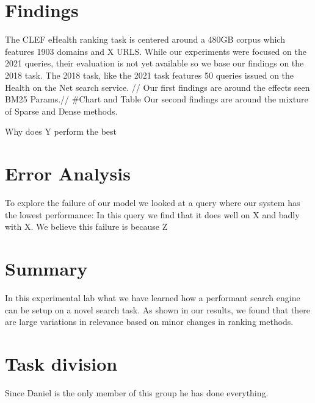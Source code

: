 \documentclass[11pt]{article}
\begin{document}
\section{Findings}
The CLEF eHealth ranking task is centered around a 480GB corpus which features 1903 domains and X URLS. While our experiments were focused on the 2021 queries, their evaluation is not yet available so we base our findings on the 2018 task. The 2018 task, like the 2021 task features 50 queries issued on the Health on the Net search service. //
Our first findings are around the effects seen BM25 Params.//
#Chart and Table
Our second findings are around the mixture of Sparse and Dense methods.

Why does Y perform the best
\section{Error Analysis}
To explore the failure of our model we looked at a query where our system has the lowest performance:{} 
In this query we find that it does well on X and badly with X. We believe this failure is because Z
\section{Summary}
In this experimental lab what we have learned how a performant search engine can be setup on a novel search task. As shown in our results, we found that there are large variations in relevance based on minor changes in ranking methods.  
\section{Task division}
Since Daniel is the only member of this group he has done everything. 
\end{document}
